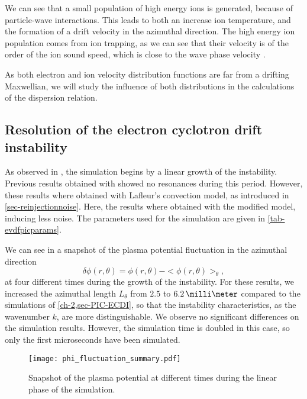   We can see that a small population of high energy ions is generated, because of particle-wave interactions.
  This leads to both an increase ion temperature, and the formation of a drift velocity in the azimuthal direction.
  The high energy ion population comes from ion trapping, as we can see that their velocity is of the order of the ion sound speed, which is close to the wave phase velocity \citep{lafleur2018}.
  
  \vspace{1em}
  As both electron and ion velocity distribution functions are far from a drifting Maxwellian, we will study the influence of both distributions in the calculations of the dispersion relation.
  
  
  
  \subsection{Resolution of the electron cyclotron drift instability} \label{subsec-ECDIPIC}
  
  
    As observed in , the simulation begins by a linear growth of the instability.
    Previous results obtained with \LPPic \citep{croes2017a} showed no resonances during this period.
    However, these results where obtained with Lafleur's convection model, as introduced in \cref{sec-reinjectionnoise}.
    Here, the results where obtained with the modified model, inducing less noise.
    The parameters used for the simulation are given in \cref{tab-evdfpicparams}.
    
    We can see in   a snapshot of the plasma potential fluctuation in the azimuthal direction \[ \delta \phi(r, \theta) = \phi(r, \theta) - < \phi(r, \theta) >_{ \theta}, \]
    at four different times during the growth of the instability.
    For these results, we increased the azimuthal length $L_{\theta}$ from $2.5$ to $6.2\,\milli\meter$ compared to the simulations of \cref{ch-2,sec-PIC-ECDI}, so that the instability characteristics, as the wavenumber $k$, are more distinguishable.
    We observe no significant differences on the simulation results.
    However, the simulation time is doubled in this case, so only the first microseconds have been simulated.
    

    
    \begin{figure}[hbtp]
      \centering
      \texttt{[image: phi\_fluctuation\_summary.pdf]}
      \caption{Snapshot of the plasma potential at different times during the linear phase of the simulation.}
      \label{fig-phi_fluctuation_summary}
    \end{figure}
    
